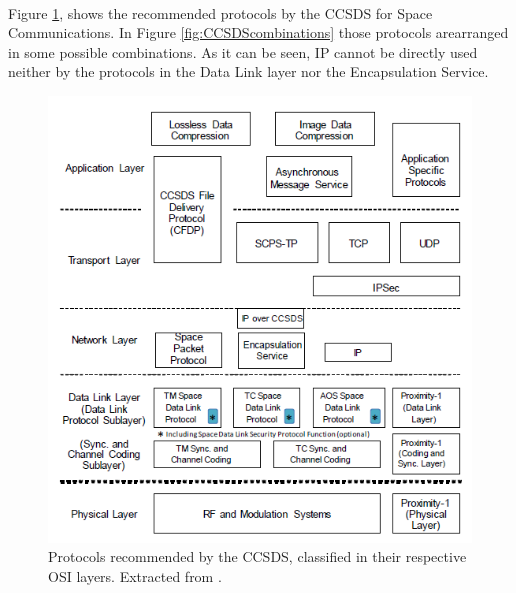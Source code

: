 \documentclass[12pt,a4paper]{report}
\begin{document}
\paragraph{}Figure \ref{fig:CCSDSprotocols}, shows the recommended protocols by the CCSDS for Space Communications. In Figure \ref{fig:CCSDScombinations} those protocols arearranged in some possible combinations. As it can be seen, IP cannot be directly used neither by the protocols in the Data Link layer nor the Encapsulation Service.
\begin{figure}[H]
\begin{center}
\includegraphics[scale=1]{CCSDSprotocols.PNG}
\caption[CCSDS Recommended Protocols]{Protocols recommended by the CCSDS, classified in their respective OSI layers. Extracted from \cite{CCSDSOverview}.}
\label{fig:CCSDSprotocols}
\end{center}
\end{figure}
\end{document}
